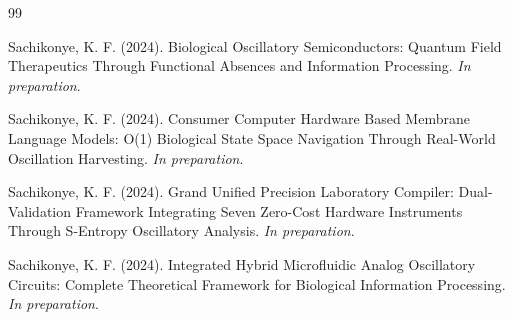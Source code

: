 \documentclass[11pt,a4paper]{article}
\begin{document}

\begin{thebibliography}{99}

Sachikonye, K. F. (2024). Biological Oscillatory Semiconductors: Quantum Field Therapeutics Through Functional Absences and Information Processing. \textit{In preparation}.

Sachikonye, K. F. (2024). Consumer Computer Hardware Based Membrane Language Models: O(1) Biological State Space Navigation Through Real-World Oscillation Harvesting. \textit{In preparation}.

Sachikonye, K. F. (2024). Grand Unified Precision Laboratory Compiler: Dual-Validation Framework Integrating Seven Zero-Cost Hardware Instruments Through S-Entropy Oscillatory Analysis. \textit{In preparation}.

Sachikonye, K. F. (2024). Integrated Hybrid Microfluidic Analog Oscillatory Circuits: Complete Theoretical Framework for Biological Information Processing. \textit{In preparation}.

\end{thebibliography}
\end{document}
